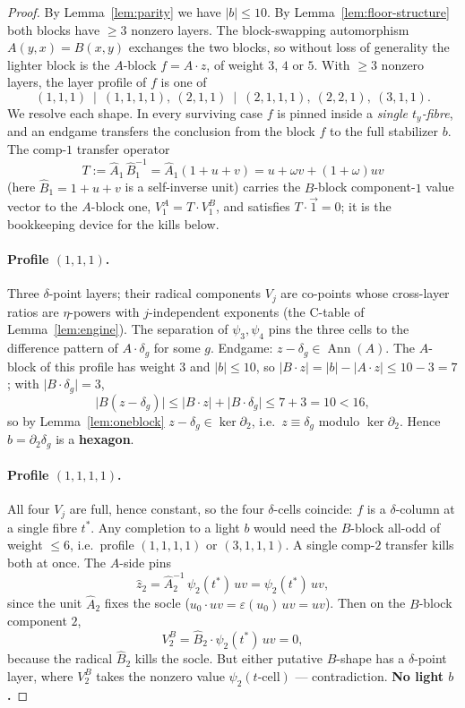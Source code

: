 \documentclass[11pt]{article}
\newcommand{\wt}[1]{\lvert #1\rvert}
\DeclareMathOperator{\Ann}{Ann}
\newcommand{\aug}{\varepsilon}
\newcommand{\hA}{\hat{A}}
\newcommand{\hB}{\hat{B}}
\newcommand{\ty}{t_y}
\theoremstyle{plain}
\theoremstyle{definition}
\theoremstyle{remark}
\begin{document}
\begin{proof}
By Lemma~\ref{lem:parity} we have $\wt b\le 10$. By Lemma~\ref{lem:floor-structure} both
blocks have $\ge 3$ nonzero layers. The block-swapping automorphism $A(y,x)=B(x,y)$
exchanges the two blocks, so without loss of generality the lighter block is the $A$-block
$f=A\cdot z$, of weight $3$, $4$ or $5$. With $\ge 3$ nonzero layers, the layer profile of
$f$ is one of
\[
  (1,1,1)\ \mid\ (1,1,1,1),\ (2,1,1)\ \mid\ (2,1,1,1),\ (2,2,1),\ (3,1,1).
\]
We resolve each shape. In every surviving case $f$ is pinned inside a \emph{single
$\ty$-fibre}, and an endgame transfers the conclusion from the block $f$ to the full
stabilizer $b$. The comp-$1$ transfer operator
\[
  T:=\hA_1\,\hB_1^{-1}=\hA_1(1+u+v)=u+\omega v+(1+\omega)uv
\]
(here $\hB_1=1+u+v$ is a self-inverse unit) carries the $B$-block component-$1$ value
vector to the $A$-block one, $V_1^A=T\cdot V_1^B$, and satisfies $T\cdot\vec 1=0$; it is
the bookkeeping device for the kills below.

\paragraph{Profile $(1,1,1)$.} Three $\delta$-point layers; their radical components $V_j$
are co-points whose cross-layer ratios are $\eta$-powers with $j$-independent exponents
(the C-table of Lemma~\ref{lem:engine}). The separation of $\psi_3,\psi_4$ pins the three
cells to the difference pattern of $A\cdot\delta_g$ for some $g$. Endgame:
$z-\delta_g\in\Ann(A)$. The $A$-block of this profile has weight $3$ and $\wt b\le10$, so
$\wt{B\cdot z}=\wt b-\wt{A\cdot z}\le 10-3=7$; with $\wt{B\cdot\delta_g}=3$,
\[
  \wt{B(z-\delta_g)}\le\wt{B\cdot z}+\wt{B\cdot\delta_g}\le 7+3=10<16,
\]
so by Lemma~\ref{lem:oneblock} $z-\delta_g\in\ker\partial_2$, i.e.\ $z\equiv\delta_g$
modulo $\ker\partial_2$. Hence $b=\partial_2\delta_g$ is a \textbf{hexagon}.

\paragraph{Profile $(1,1,1,1)$.} All four $V_j$ are full, hence constant, so the four
$\delta$-cells coincide: $f$ is a $\delta$-column at a single fibre $t^\ast$. Any
completion to a light $b$ would need the $B$-block all-odd of weight $\le 6$, i.e.\ profile
$(1,1,1,1)$ or $(3,1,1,1)$. A single comp-$2$ transfer kills both at once. The $A$-side
pins
\[
  \hat z_2=\hA_2^{-1}\,\psi_2(t^\ast)\,uv=\psi_2(t^\ast)\,uv,
\]
since the unit $\hA_2$ fixes the socle ($u_0\cdot uv=\aug(u_0)\,uv=uv$). Then on the
$B$-block component $2$,
\[
  V_2^B=\hB_2\cdot\psi_2(t^\ast)\,uv=0,
\]
because the radical $\hB_2$ kills the socle. But either putative $B$-shape has a
$\delta$-point layer, where $V_2^B$ takes the nonzero value $\psi_2(\text{$t$-cell})$ ---
contradiction. \textbf{No light $b$.}


\end{proof}
\end{document}
